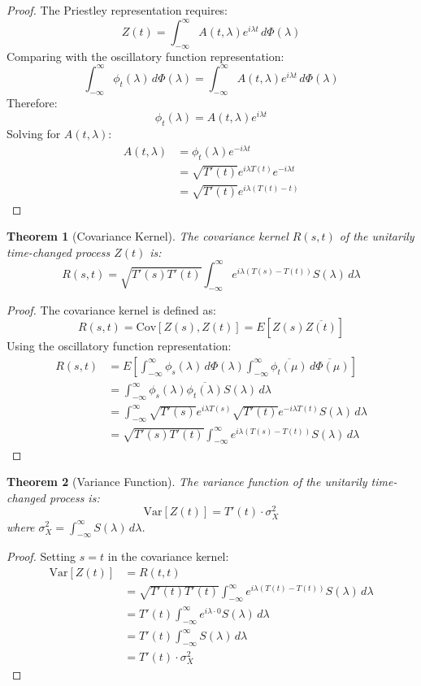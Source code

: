 \documentclass{article}
\newtheorem{theorem}{Theorem}
\begin{document}
\begin{proof}
The Priestley representation requires:
\[
Z(t) = \int_{-\infty}^{\infty} A(t,\lambda) e^{i\lambda t} \, d\Phi(\lambda)
\]
Comparing with the oscillatory function representation:
\[
\int_{-\infty}^{\infty} \phi_t(\lambda) \, d\Phi(\lambda) = \int_{-\infty}^{\infty} A(t,\lambda) e^{i\lambda t} \, d\Phi(\lambda)
\]
Therefore:
\[
\phi_t(\lambda) = A(t,\lambda) e^{i\lambda t}
\]
Solving for $A(t,\lambda)$:
\begin{align}
A(t,\lambda) &= \phi_t(\lambda) e^{-i\lambda t} \\
&= \sqrt{T'(t)} e^{i\lambda T(t)} e^{-i\lambda t} \\
&= \sqrt{T'(t)} e^{i\lambda(T(t)-t)}
\end{align}
\end{proof}

\begin{theorem}[Covariance Kernel]
The covariance kernel $R(s,t)$ of the unitarily time-changed process $Z(t)$ is:
\[
R(s,t) = \sqrt{T'(s)T'(t)} \int_{-\infty}^{\infty} e^{i\lambda(T(s)-T(t))} S(\lambda) \, d\lambda
\]
\end{theorem}

\begin{proof}
The covariance kernel is defined as:
\[
R(s,t) = \text{Cov}[Z(s), Z(t)] = E[Z(s) \overline{Z(t)}]
\]
Using the oscillatory function representation:
\begin{align}
R(s,t) &= E\left[\int_{-\infty}^{\infty} \phi_s(\lambda) \, d\Phi(\lambda) \int_{-\infty}^{\infty} \overline{\phi_t(\mu)} \, \overline{d\Phi(\mu)}\right] \\
&= \int_{-\infty}^{\infty} \phi_s(\lambda) \overline{\phi_t(\lambda)} S(\lambda) \, d\lambda \\
&= \int_{-\infty}^{\infty} \sqrt{T'(s)} e^{i\lambda T(s)} \sqrt{T'(t)} e^{-i\lambda T(t)} S(\lambda) \, d\lambda \\
&= \sqrt{T'(s)T'(t)} \int_{-\infty}^{\infty} e^{i\lambda(T(s)-T(t))} S(\lambda) \, d\lambda
\end{align}
\end{proof}

\begin{theorem}[Variance Function]
The variance function of the unitarily time-changed process is:
\[
\text{Var}[Z(t)] = T'(t) \cdot \sigma_X^2
\]
where $\sigma_X^2 = \int_{-\infty}^{\infty} S(\lambda) \, d\lambda$.
\end{theorem}

\begin{proof}
Setting $s = t$ in the covariance kernel:
\begin{align}
\text{Var}[Z(t)] &= R(t,t) \\
&= \sqrt{T'(t)T'(t)} \int_{-\infty}^{\infty} e^{i\lambda(T(t)-T(t))} S(\lambda) \, d\lambda \\
&= T'(t) \int_{-\infty}^{\infty} e^{i\lambda \cdot 0} S(\lambda) \, d\lambda \\
&= T'(t) \int_{-\infty}^{\infty} S(\lambda) \, d\lambda \\
&= T'(t) \cdot \sigma_X^2
\end{align}
\end{proof}
\end{document}

